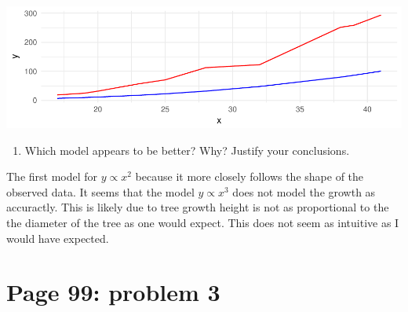 \documentclass[]{article}
\newenvironment{Shaded}{\begin{snugshade}}{\end{snugshade}}
\newcommand{\KeywordTok}[1]{\textcolor[rgb]{0.13,0.29,0.53}{\textbf{{#1}}}}
\newcommand{\DataTypeTok}[1]{\textcolor[rgb]{0.13,0.29,0.53}{{#1}}}
\newcommand{\DecValTok}[1]{\textcolor[rgb]{0.00,0.00,0.81}{{#1}}}
\newcommand{\StringTok}[1]{\textcolor[rgb]{0.31,0.60,0.02}{{#1}}}
\newcommand{\NormalTok}[1]{{#1}}
\providecommand{\tightlist}{%
  \setlength{\itemsep}{0pt}\setlength{\parskip}{0pt}}
\begin{document}
\begin{Shaded}
\end{Shaded}

\includegraphics{CHunt_homework2_files/figure-latex/unnamed-chunk-4-1.pdf}

\begin{enumerate}
\def\labelenumi{\alph{enumi}.}
\setcounter{enumi}{1}
\tightlist
\item
  Which model appears to be better? Why? Justify your conclusions.
\end{enumerate}

The first model for \(y \propto x^2\) because it more closely follows
the shape of the observed data. It seems that the model
\(y \propto x^3\) does not model the growth as accuractly. This is
likely due to tree growth height is not as proportional to the the
diameter of the tree as one would expect. This does not seem as
intuitive as I would have expected.

\section{Page 99: problem 3}\label{page-99-problem-3}
\end{document}
